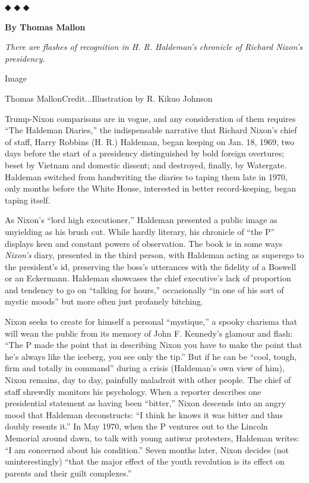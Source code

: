 ◆ ◆ ◆

\textbf{By Thomas Mallon}

\emph{There are flashes of recognition in H. R. Haldeman's chronicle of
Richard Nixon's presidency.}

Image

Thomas MallonCredit...Illustration by R. Kikuo Johnson

Trump-Nixon comparisons are in vogue, and any consideration of them
requires ``The Haldeman Diaries,'' the indispensable narrative that
Richard Nixon's chief of staff, Harry Robbins (H. R.) Haldeman, began
keeping on Jan. 18, 1969, two days before the start of a presidency
distinguished by bold foreign overtures; beset by Vietnam and domestic
dissent; and destroyed, finally, by Watergate. Haldeman switched from
handwriting the diaries to taping them late in 1970, only months before
the White House, interested in better record-keeping, began taping
itself.

As Nixon's ``lord high executioner,'' Haldeman presented a public image
as unyielding as his brush cut. While hardly literary, his chronicle of
``the P'' displays keen and constant powers of observation. The book is
in some ways \emph{Nixon's} diary, presented in the third person, with
Haldeman acting as superego to the president's id, preserving the boss's
utterances with the fidelity of a Boswell or an Eckermann. Haldeman
showcases the chief executive's lack of proportion and tendency to go on
``talking for hours,'' occasionally ``in one of his sort of mystic
moods'' but more often just profanely bitching.

Nixon seeks to create for himself a personal ``mystique,'' a spooky
charisma that will wean the public from its memory of John F. Kennedy's
glamour and flash: ``The P made the point that in describing Nixon you
have to make the point that he's always like the iceberg, you see only
the tip.'' But if he can be ``cool, tough, firm and totally in command''
during a crisis (Haldeman's own view of him), Nixon remains, day to day,
painfully maladroit with other people. The chief of staff shrewdly
monitors his psychology. When a reporter describes one presidential
statement as having been ``bitter,'' Nixon descends into an angry mood
that Haldeman deconstructs: ``I think he knows it was bitter and thus
doubly resents it.'' In May 1970, when the P ventures out to the Lincoln
Memorial around dawn, to talk with young antiwar protesters, Haldeman
writes: ``I am concerned about his condition.'' Seven months later,
Nixon decides (not uninterestingly) ``that the major effect of the youth
revolution is its effect on parents and their guilt complexes.''

